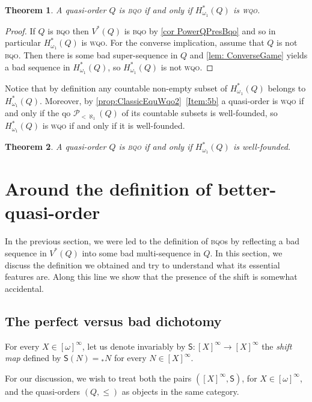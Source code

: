\documentclass{article}%
\theoremstyle{plain}
\newtheorem{theorem}{Theorem}
\newtheorem{theorem}{Theorem}[section]
\theoremstyle{definition}
\theoremstyle{remark}
\newcommand{\wqo}{\textsc{wqo}}
\newcommand{\bqo}{\textsc{bqo}}
\newcommand{\CtblSubs}{\mathcal{P}_{<\aleph_{1}}}
\newcommand{\PowerQ}{V^{*}}
\newcommand{\HerCtblQ}{H^{*}_{\omega_{1}}}
\newcommand{\shift}[1]{{}_{*}#1}
\newcommand{\SHIFT}{\mathsf{S}}
\newcommand{\infSub}[1]{[#1]^{\infty}}
\begin{document}
\begin{theorem}\label{thm BqoHerCtblWqo}
A quasi-order $Q$ is \bqo{} if and only if $\HerCtblQ(Q)$ is \wqo{}.
\end{theorem}
\begin{proof}
If $Q$ is \bqo{} then $\PowerQ(Q)$ is \bqo{} by \cref{cor PowerQPresBqo} and so in particular $\HerCtblQ(Q)$ is \wqo{}. For the converse implication, assume that $Q$ is not \bqo{}. Then there is some bad super-sequence in $Q$ and \cref{lem: ConverseGame} yields a bad sequence in $\HerCtblQ(Q)$, so $\HerCtblQ(Q)$ is not \wqo{}.
\end{proof}

Notice that by definition any countable non-empty subset of $\HerCtblQ(Q)$ belongs to $\HerCtblQ(Q)$. Moreover, by \cref{prop:ClassicEquWqo2}~\cref{Item:5b} a quasi-order is \wqo{} if and only if the qo $\CtblSubs(Q)$ of its countable subsets is well-founded, so $\HerCtblQ(Q)$ is \wqo{} if and only if it is well-founded.

\begin{theorem}\label{thm BqoHerCtblWellF}
A quasi-order $Q$ is \bqo{} if and only if $\HerCtblQ(Q)$ is well-founded.
\end{theorem}


\section{Around the definition of better-quasi-order}\label{sec AroundBQO}


In the previous section, we were led to the definition of \bqo{}s by reflecting a bad sequence in $\PowerQ(Q)$ into some bad multi-sequence in $Q$. In this section, we discuss the definition we obtained and try to understand what its essential features are. Along this line we show that the presence of the shift is somewhat accidental. %


\subsection{The perfect versus bad dichotomy}

For every $X\in\infSub{\omega}$, let us denote invariably by $\SHIFT:\infSub{X}\to\infSub{X}$ the \emph{shift map} defined by $\SHIFT(N)=\shift{N}$ for every $N\in\infSub{X}$.

For our discussion, we wish to treat both the pairs $(\infSub{X},\SHIFT)$, for $X\in\infSub{\omega}$, and the quasi-orders $(Q,\leq)$ as objects in the same category. 
\end{document}
